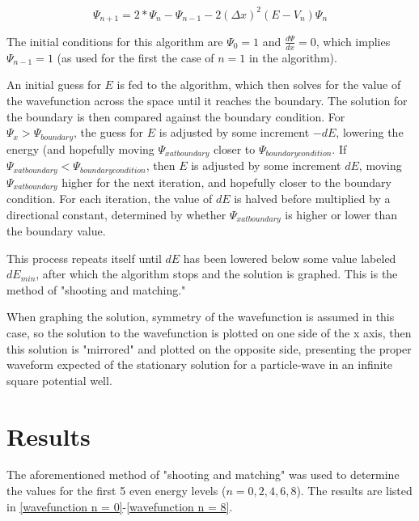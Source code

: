 \documentclass[12pt]{article}                  %
\begin{document}
\begin{equation}
\Psi_{n+1}= 2*\Psi_{n} - \Psi_{n-1} - 2(\Delta x)^2(E - V_{n})\Psi_{n}
\end{equation} 

The initial conditions for this algorithm are $\Psi_{0} = 1$ and $\frac{d\Psi}{dx} = 0$, which implies $\Psi_{n-1} = 1$ (as used for the first the case of $n = 1$ in the algorithm). 

An initial guess for $E$ is fed to the algorithm, which then solves for the value of the wavefunction across the space until it reaches the boundary. The solution for the boundary is then compared against the boundary condition. For $\Psi_{x} > \Psi_{boundary}$, the guess for $E$ is adjusted by some increment $-dE$, lowering the energy (and hopefully moving $\Psi_{x at boundary}$ closer to $\Psi_{boundary condition}$. If $\Psi_{x at boundary} < \Psi_{boundary condition}$, then $E$ is adjusted by some increment $dE$, moving $\Psi_{x at boundary}$ higher for the next iteration, and hopefully closer to the boundary condition. For each iteration, the value of $dE$ is halved before multiplied by a directional constant, determined by whether $\Psi_{x at boundary}$ is higher or lower than the boundary value. 

This process repeats itself until $dE$ has been lowered below some value labeled $dE_{min}$, after which the algorithm stops and the solution is graphed. This is the method of "shooting and matching."

When graphing the solution, symmetry of the wavefunction is assumed in this case, so the solution to the wavefunction is plotted on one side of the x axis, then this solution is "mirrored" and plotted on the opposite side, presenting the proper waveform expected of the stationary solution for a particle-wave in an infinite square potential well. 

\pagebreak

\section{Results}
The aforementioned method of "shooting and matching" was used to determine the values for the first 5 even energy levels ($n = 0, 2, 4, 6, 8$). The results are listed in \ref{wavefunction n = 0}-\ref{wavefunction n = 8}. 
\end{document}
